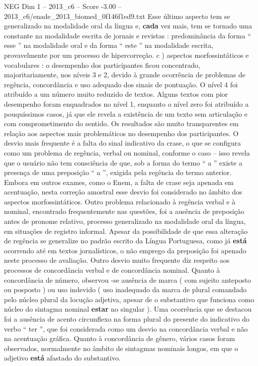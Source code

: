 \begin{textsample}{NEG Dim 1 – 2013\_c6 – Score -3.00 – 2013\_c6/enade\_2013\_biomed\_0f146f1ed9.txt}
Esse último aspecto tem se generalizado na modalidade oral da língua e, \textbf{cada} vez mais, tem se tornado uma constante na modalidade escrita de jornais e revistas : predominância da forma “ esse ” na modalidade oral e da forma “ este ” na modalidade escrita, provavelmente por um processo de hipercorreção. c ) aspectos morfossintáticos e vocabulares : o desempenho dos participantes ficou concentrado, majoritariamente, nos níveis 3 e 2, devido à grande ocorrência de problemas de regência, concordância e uso adequado dos sinais de pontuação.
O nível 4 foi atribuído a um número muito reduzido de textos.
Alguns textos com pior desempenho foram enquadrados no nível 1, enquanto o nível zero foi atribuído a pouquíssimos casos, já que ele revela a existência de um texto sem articulação e com comprometimento do sentido.
Os resultados são muito transparentes em relação aos aspectos mais problemáticos no desempenho dos participantes.
O desvio mais frequente é a falta do sinal indicativo da crase, o que se configura como um problema de regência, verbal ou nominal, conforme o caso – isso revela que o usuário não tem consciência de que, sob a forma do termo “ a ” existe a presença de uma preposição “ a ”, exigida pela regência do termo anterior.
Embora em outros exames, como o Enem, a falta de crase seja apenada em acentuação, nesta correção amostral esse desvio foi considerado no âmbito dos aspectos morfossintáticos.
Outro problema relacionado à regência verbal e à nominal, encontrado frequentemente nas questões, foi a ausência de preposição antes de pronome relativo, processo generalizado na modalidade oral da língua, em situações de registro informal.
Apesar da possibilidade de que essa alteração de regência se generalize no padrão escrito da Língua Portuguesa, como já \textbf{está} ocorrendo até em textos jornalísticos, o não emprego da preposição foi apenado neste processo de avaliação.
Outro desvio muito frequente diz respeito aos processos de concordância verbal e de concordância nominal.
Quanto à concordância de número, observou -se ausência de marca ( com sujeito anteposto ou posposto ) ou uso indevido ( uso inadequado da marca de plural comandado pelo núcleo plural da locução adjetiva, apesar de o substantivo que funciona como núcleo do sintagma nominal \textbf{estar} no singular ).
Uma ocorrência que se destacou foi a ausência de acento circunflexo na forma plural do presente do indicativo do verbo “ ter ”, que foi considerada como um desvio na concordância verbal e não na acentuação gráfica.
Quanto à concordância de gênero, vários casos foram observados, normalmente no âmbito de sintagmas nominais longos, em que o adjetivo \textbf{está} afastado do substantivo.

\end{textsample}
